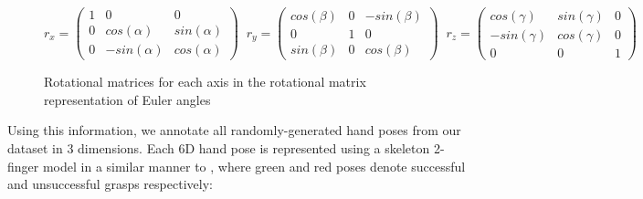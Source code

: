 \documentclass[11pt, a4paper]{report}
\begin{document}
\begin{figure}[H]
    \centering
    \begin{equation*}
        r_x = \begin{pmatrix}1&0&0 \\ 0&cos(\alpha)&sin(\alpha) \\ 0&-sin(\alpha)&cos(\alpha)\end{pmatrix}\;\;
        r_y = \begin{pmatrix}cos(\beta)&0&-sin(\beta) \\ 0&1&0 \\ sin(\beta)&0&cos(\beta)\end{pmatrix}\;\;
        r_z = \begin{pmatrix}cos(\gamma)&sin(\gamma)&0 \\ -sin(\gamma)&cos(\gamma)&0 \\ 0&0&1 \end{pmatrix}
    \end{equation*}
    \caption{Rotational matrices for each axis in the rotational matrix representation of Euler angles}
    \label{fig:4.4}
\end{figure}

\noindent Using this information, we annotate all randomly-generated hand poses from our dataset in 3 dimensions. Each 6D hand pose is represented using a skeleton 2-finger model in a similar manner to \cite{Bekiroglu2012LearningTA}, where green and red poses denote successful and unsuccessful grasps respectively:
\end{document}
